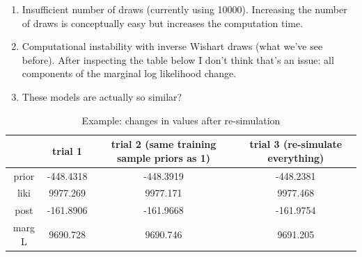 \documentclass[12pt]{article}
\begin{document}
\begin{enumerate}
	\item Insufficient number of draws (currently using 10000). Increasing the number of draws is conceptually easy but increases the computation time.
	\item Computational instability with inverse Wishart draws (what we've see before). After inspecting the table below I don't think that's an issue: all components of the marginal log likelihood change. 
	\item These models are actually so similar?
\end{enumerate}
\begin{table}[]
	\centering

	\label{my-label}
	\begin{tabular}{cccc}
		& trial 1 & trial 2 (same training sample priors as 1) & trial 3 (re-simulate everything)\\
		\hline
prior  & -448.4318 & -448.3919 & -448.2381 \\
liki   & 9977.269  & 9977.171  & 9977.468  \\
post   & -161.8906 & -161.9668 & -161.9754 \\
marg L & 9690.728  & 9690.746  & 9691.205 
	\end{tabular}
		\caption{Example: changes in values after re-simulation}
\end{table}
\end{document}
